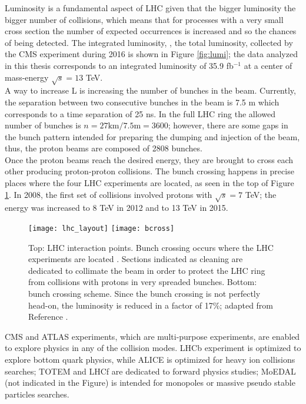 \noindent Luminosity is a fundamental aspect of LHC given that the bigger luminosity the bigger number of collisions, which means that for processes with a very small cross section the number of expected occurrences is increased and so the chances of being detected. The integrated luminosity, \ie, the total luminosity, collected by the CMS experiment during 2016 is shown in Figure \ref{fig:lumi}; the data analyzed in this thesis corresponds to an integrated luminosity of 35.9 fb$^{-1}$ at a center of mass-energy $\sqrt{s}=13$ TeV.\\

\noindent A way to increase L is increasing the number of bunches in the beam. Currently, the separation between two consecutive bunches in the beam is 7.5 m which corresponds to a time separation of 25 ns. In the full LHC ring the allowed number of bunches is $n=27\textrm{km}/7.5\textrm{m}=3600$; however, there are some gaps in the bunch pattern intended for preparing the dumping and injection of the beam, thus, the proton beams are composed of 2808 bunches. \\

\noindent Once the proton beams reach the desired energy, they are brought to cross each other producing proton-proton collisions. The bunch crossing happens in precise places where the four LHC experiments are located, as seen in the top of Figure \ref{fig:lhc_layout}. In 2008, the first set of collisions involved protons with $\sqrt{s}=7$ TeV; the energy was increased to 8 TeV in 2012 and to 13 TeV in 2015.\\

\begin{figure}[!h]
\centering
\texttt{[image: lhc\_layout]}
\texttt{[image: bcross]}
\caption [LHC interaction points]{Top: LHC interaction points. Bunch crossing occurs where the LHC experiments are located \cite{lhc_layout}. Sections indicated as cleaning are dedicated to collimate the beam in order to protect the LHC ring from collisions with protons in very spreaded bunches. Bottom: bunch crossing scheme. Since the bunch crossing is not perfectly head-on, the luminosity is reduced in a factor of 17\%; adapted from Reference \cite{l1}.}\label{fig:lhc_layout}
\end{figure}

\noindent CMS and ATLAS experiments, which are multi-purpose experiments, are enabled to explore physics in any of the collision modes. LHCb experiment is optimized to explore bottom quark physics, while ALICE is optimized for heavy ion collisions searches; TOTEM and LHCf are dedicated to forward physics studies; MoEDAL (not indicated in the Figure) is intended for monopoles or massive pseudo stable particles searches.\\

